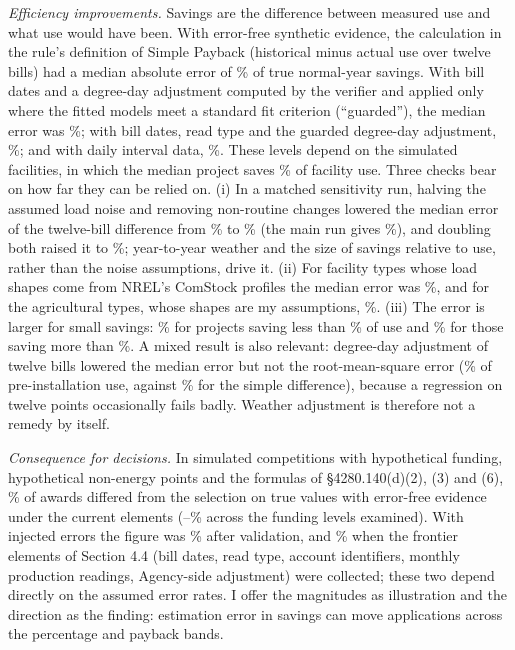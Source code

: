\documentclass[11pt]{article}
\begin{document}
\emph{Efficiency improvements.} Savings are the difference between measured use and
what use would have been. With error-free synthetic evidence, the calculation in the
rule's definition of Simple Payback (historical minus actual use over twelve bills) had
a median absolute error of \PathUndatedNormalMedian\% of true normal-year savings. With
bill dates and a degree-day adjustment computed by the verifier and applied only where the
fitted models meet a standard fit criterion (``guarded''), the median error was
\PathNormNormalMedian\%; with bill dates, read type and the guarded degree-day adjustment,
\PathNormMergedNormalMedian\%; and with daily interval data,
\PathIntervalPathNormalMedian\%. These levels depend on the simulated facilities, in which
the median project saves \MedianSavingsFraction\% of facility use. Three checks bear on
how far they can be relied on. (i) In a matched sensitivity run, halving the assumed load
noise and removing non-routine changes lowered the median error of the twelve-bill
difference from \NoiseCentralUndatedExact\% to \NoiseLowUndatedExact\% (the main run gives
\PathUndatedNormalMedian\%), and doubling both raised it to \NoiseHighUndatedExact\%; year-to-year weather and the size of
savings relative to use, rather than the noise assumptions, drive it. (ii) For facility
types whose load shapes come from NREL's ComStock profiles the median error was
\BasisComstockUndatedMedian\%, and for the agricultural types, whose shapes are my
assumptions, \BasisHypotheticalUndatedMedian\%. (iii) The error is larger for small
savings: \BandLowUndatedMedian\% for projects saving less than \BandLowEdge\% of use and
\BandHighUndatedMedian\% for those saving more than \BandHighEdge\%. A mixed result is also
relevant: degree-day adjustment of twelve bills lowered the median error but not the
root-mean-square error (\NormEeiNormRmse\% of pre-installation use, against
\NormEeiRawRmse\% for the simple difference), because a regression on twelve points
occasionally fails badly. Weather adjustment is therefore not a remedy by itself.

\emph{Consequence for decisions.} In simulated competitions with hypothetical funding,
hypothetical non-energy points and the formulas of \S4280.140(d)(2), (3) and (6),
\SelCurrentCleanMid\% of awards differed from the selection on true values with error-free
evidence under the current elements (\SelCurrentCleanHigh--\SelCurrentCleanLow\% across the
funding levels examined). With injected errors the figure was \SelCurrentValidatedMid\%
after validation, and \SelRecValidatedMid\% when the frontier elements of Section 4.4 (bill
dates, read type, account identifiers, monthly production readings, Agency-side
adjustment) were collected; these two depend directly on the assumed error rates. I offer the
magnitudes as illustration and the direction as the finding: estimation error in savings
can move applications across the percentage and payback bands.
\end{document}

